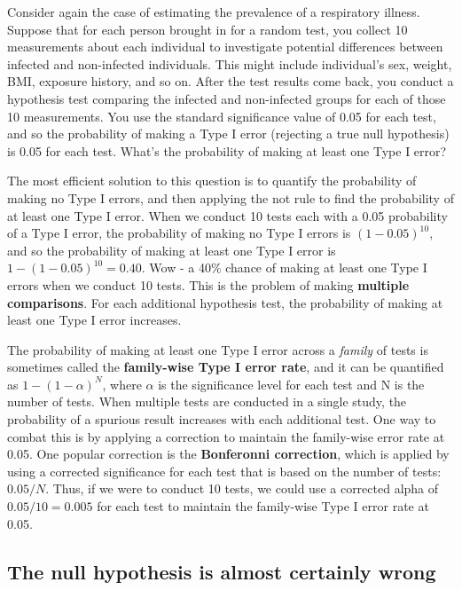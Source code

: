 \documentclass[
]{book}
\begin{document}
Consider again the case of estimating the prevalence of a respiratory illness. Suppose that for each person brought in for a random test, you collect 10 measurements about each individual to investigate potential differences between infected and non-infected individuals. This might include individual's sex, weight, BMI, exposure history, and so on. After the test results come back, you conduct a hypothesis test comparing the infected and non-infected groups for each of those 10 measurements. You use the standard significance value of 0.05 for each test, and so the probability of making a Type I error (rejecting a true null hypothesis) is 0.05 for each test. What's the probability of making at least one Type I error?

The most efficient solution to this question is to quantify the probability of making no Type I errors, and then applying the not rule to find the probability of at least one Type I error. When we conduct 10 tests each with a 0.05 probability of a Type I error, the probability of making no Type I errors is \((1-0.05)^{10}\), and so the probability of making at least one Type I error is \(1 - (1-0.05)^{10}=0.40\). Wow - a 40\% chance of making at least one Type I errors when we conduct 10 tests. This is the problem of making \textbf{multiple comparisons}. For each additional hypothesis test, the probability of making at least one Type I error increases.

The probability of making at least one Type I error across a \emph{family} of tests is sometimes called the \textbf{family-wise Type I error rate}, and it can be quantified as \(1-(1 - \alpha)^N\), where \(\alpha\) is the significance level for each test and N is the number of tests. When multiple tests are conducted in a single study, the probability of a spurious result increases with each additional test. One way to combat this is by applying a correction to maintain the family-wise error rate at 0.05. One popular correction is the \textbf{Bonferonni correction}, which is applied by using a corrected significance for each test that is based on the number of tests: \(0.05/N\). Thus, if we were to conduct 10 tests, we could use a corrected alpha of \(0.05/10=0.005\) for each test to maintain the family-wise Type I error rate at 0.05.

\subsection{The null hypothesis is almost certainly wrong}\label{the-null-hypothesis-is-almost-certainly-wrong}
\end{document}
